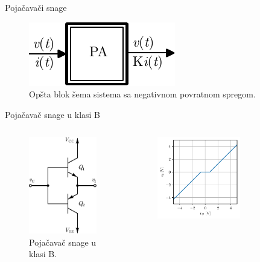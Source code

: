 \documentclass[aspectratio=169,xcolor=dvipsnames]{beamer}
\begin{document}
\begin{frame}{Pojačavači snage}
    \begin{figure}
    \includegraphics[width=0.3\linewidth]{fig/pa.pdf}
    \caption{Opšta blok šema sistema sa negativnom povratnom spregom.}
    \end{figure}
\end{frame}



\begin{frame}{Pojačavač snage u klasi B}
	\begin{columns}[c]
    \begin{column}{.5\textwidth}
    \begin{figure}
        \centering
        \includegraphics[scale = 0.75]{fig/PAB.pdf}
        \caption{Pojačavač snage u klasi B.}
    \end{figure}      
    \end{column}
    \begin{column}{.5\textwidth}
    \begin{figure}
        \centering
        \includegraphics[width=0.65\textwidth]{fig/PAbkka.pdf}

\end{figure}
\end{column}
\end{columns}
\end{frame}
\end{document}
